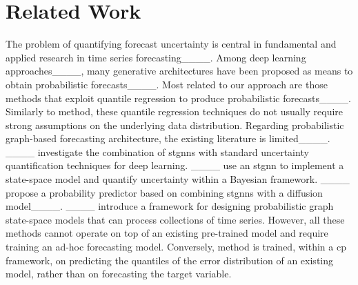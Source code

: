 \section{Related Work}
\label{sec:related}

The problem of quantifying forecast uncertainty is central in fundamental and applied research in time series forecasting____. Among deep learning approaches____, many generative architectures have been proposed as means to obtain probabilistic forecasts____. Most related to our approach are those methods that exploit quantile regression to produce probabilistic forecasts____. 
Similarly to \gls{method}, these quantile regression techniques do not usually require strong assumptions on the underlying data distribution.  
Regarding probabilistic graph-based forecasting architecture, the existing literature is limited____. ____ investigate the combination of \glspl{stgnn} with standard uncertainty quantification techniques for deep learning. ____ use an \gls{stgnn} to implement a state-space model and quantify uncertainty within a Bayesian framework. ____ propose a probability predictor based on combining \glspl{stgnn} with a diffusion model____. ____ introduce a framework for designing probabilistic graph state-space models that can process collections of time series. However, all these methods cannot operate on top of an existing pre-trained model and require training an ad-hoc forecasting model. Conversely, \gls{method} is trained, within a \gls{cp} framework, on predicting the quantiles of the error distribution of an existing model, rather than on forecasting the target variable.

